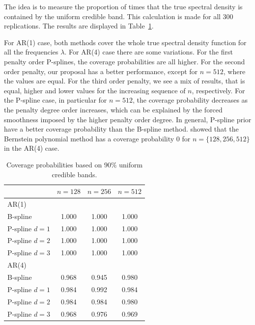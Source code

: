 \documentclass[aps,reprint,amsmath,amssymb,showpacs,showkeys]{revtex4-1}%
\begin{document}
The idea is to measure the proportion of times that the true spectral density is contained by the uniform credible band.  This calculation is made for all 300 replications.  The results are displayed in Table~\ref{table:sim_covPbb}.

For AR(1) case, both methods cover the whole true spectral density function for all the frequencies $\lambda$.  For AR(4) case there are some variations.  For the first penalty order P-splines, the coverage probabilities are all higher.  For the second order penalty, our proposal has a better performance, except for $n=512$, where the values are equal.  For the third order penalty, we see a mix of results, that is equal, higher and lower values for the increasing sequence of $n$, respectively.  For the P-spline case, in particular for $n=512$, the coverage probability decreases as the penalty degree order increases, which can be explained by the forced smoothness imposed by the higher penalty order degree.  In general, P-spline prior have a better coverage probability than the B-spline method.  \cite{Edwards2018} showed that the Bernstein polynomial method has a coverage probability 0 for $n = \{128,256,512\}$ in the AR(4) case.

\begin{table}
	\centering
	\begin{ruledtabular}
	\begin{tabular}{lccc}
		\toprule
		          & $n=128$ & $n=256$ & $n=512$ \\ \hline
		AR(1)     &  &  &  \\ 
		B-spline &  1.000 & 1.000 & 1.000 \\
		P-spline $d=1$ & 1.000 & 1.000 & 1.000  \\
		P-spline $d=2$& 1.000 & 1.000 & 1.000 \\
		P-spline $d=3$& 1.000 & 1.000 & 1.000 \\ \hline		       
		AR(4)     &  &  &  \\ 
		B-spline &  0.968 & 0.945 & 0.980  \\
		P-spline $d=1$ & 0.984 & 0.992 & 0.984  \\
		P-spline $d=2$& 0.984 & 0.984 & 0.980 \\
		P-spline $d=3$& 0.968 & 0.976 & 0.969  \\		
		\bottomrule
	\end{tabular}
	\end{ruledtabular}
	\caption{Coverage probabilities based on $90\%$ uniform credible bands.}
	\label{table:sim_covPbb}
\end{table}
\end{document}
